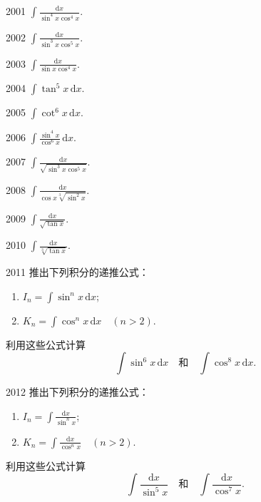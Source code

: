 \begin{prob}[S]{2001}
$\int \frac{\mathrm{d}x}{\sin^4 x \cos^4 x}$.
\end{prob}

\begin{prob}[S]{2002}
$\int \frac{\mathrm{d}x}{\sin^3 x \cos^5 x}$.
\end{prob}

\begin{prob}[S]{2003}
$\int \frac{\mathrm{d}x}{\sin x \cos^4 x}$.
\end{prob}

\begin{prob}[S]{2004}
$\int \tan^5 x \,\mathrm{d}x$.
\end{prob}

\begin{prob}[S]{2005}
$\int \cot^6 x \,\mathrm{d}x$.
\end{prob}

\begin{prob}[S]{2006}
$\int \frac{\sin^4 x}{\cos^6 x} \,\mathrm{d}x$.
\end{prob}

\begin{prob}[S]{2007}
$\int \frac{\mathrm{d}x}{\sqrt{\sin^3 x \cos^5 x}}$.
\end{prob}

\begin{prob}[S]{2008}
$\int \frac{\mathrm{d}x}{\cos x \sqrt[3]{\sin^2 x}}$.
\end{prob}

\begin{prob}[S]{2009}
$\int \frac{\mathrm{d}x}{\sqrt{\tan x}}$.
\end{prob}

\begin{prob}[S]{2010}
$\int \frac{\mathrm{d}x}{\sqrt[3]{\tan x}}$.
\end{prob}

\begin{prob}[M]{2011}
推出下列积分的递推公式：
\begin{enumerate}[label=(\alph*), itemsep=2pt, topsep=3pt]
\item $I_n = \int \sin^n x \,\mathrm{d}x$;
\item $K_n = \int \cos^n x \,\mathrm{d}x \quad (n > 2)$.
\end{enumerate}
利用这些公式计算
\[
\int \sin^6 x \,\mathrm{d}x \quad \text{和} \quad \int \cos^8 x \,\mathrm{d}x.
\]
\end{prob}

\begin{prob}[M]{2012}
推出下列积分的递推公式：
\begin{enumerate}[label=(\alph*), itemsep=2pt, topsep=3pt]
\item $I_n = \int \frac{\mathrm{d}x}{\sin^n x}$;
\item $K_n = \int \frac{\mathrm{d}x}{\cos^n x} \quad (n > 2)$.
\end{enumerate}
利用这些公式计算
\[
\int \frac{\mathrm{d}x}{\sin^5 x} \quad \text{和} \quad \int \frac{\mathrm{d}x}{\cos^7 x}.
\]
\end{prob}

